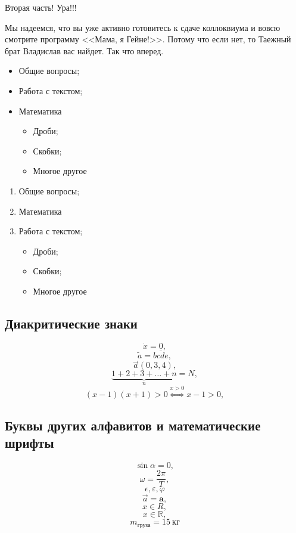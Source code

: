 \documentclass[a4paper,12pt]{article} %
\begin{document}
\begin{center}
Вторая часть! Ура!!!
\end{center}

\begin{flushright}
Мы надеемся, что вы уже активно готовитесь к сдаче коллоквиума и вовсю смотрите программу <<Мама, я Гейне!>>. Потому что если нет, то Таежный брат Владислав вас найдет. Так что вперед.
\end{flushright}

\begin{itemize}
\item Общие вопросы;
\item Работа с текстом;
\item Математика
\begin{itemize}
\item Дроби;
\item Скобки;
\item Многое другое
\end{itemize}
\end{itemize}

\begin{enumerate}


\item Общие вопросы;
\item Математика
\item Работа с текстом;

\begin{itemize}
\item Дроби;
\item Скобки;
\item Многое другое
\end{itemize}
\end{enumerate}


\subsection{Диакритические знаки}

\[ \dot{x}=0, \]
\[ \tilde{a}=\overline{bcde}, \]
\[ \overrightarrow{a} (0,3,4), \]
\[ \underbrace{1+2+3+\dots+n}_{n}=N, \]
\[ (x-1)(x+1)>0 \stackrel{x>0}{\Longleftrightarrow} x-1>0, \]


\subsection{Буквы других алфавитов и математические шрифты}

\[ \sin \alpha = 0, \]
\[ \omega = \frac{2\pi}{T}, \]
\[ \epsilon, \varepsilon, \varphi \]
\[ \overrightarrow{a}=\mathbf{a}, \]
\[ x\in R, \]
\[ x\in \mathbb{R}, \]
\[ m_{\text{груза}}= 15~\text{кг} \]
\end{document}
